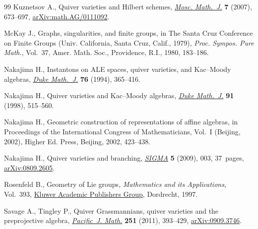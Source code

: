\documentclass[11pt]{article}
\numberwithin{equation}{section}
\numberwithin{equation}{section}
\begin{document}
\begin{thebibliography}{99}
Kuznetsov A., Quiver varieties and {H}ilbert schemes, \href{https://doi.org/10.17323/1609-4514-2007-7-4-673-697}{\textit{Mosc. Math.~J.}}
 \textbf{7} (2007), 673--697, \href{https://arxiv.org/abs/math.AG/0111092}{arXiv:math.AG/0111092}.

McKay J., Graphs, singularities, and finite groups, in The {S}anta {C}ruz
 {C}onference on {F}inite {G}roups ({U}niv. {C}alifornia, {S}anta {C}ruz,
 {C}alif., 1979), \textit{Proc. Sympos. Pure Math.}, Vol.~37, Amer. Math.
 Soc., Providence, R.I., 1980, 183--186.

Nakajima H., Instantons on {ALE} spaces, quiver varieties, and {K}ac--{M}oody
 algebras, \href{https://doi.org/10.1215/S0012-7094-94-07613-8}{\textit{Duke Math.~J.}} \textbf{76} (1994), 365--416.

Nakajima H., Quiver varieties and {K}ac--{M}oody algebras, \href{https://doi.org/10.1215/S0012-7094-98-09120-7}{\textit{Duke
 Math.~J.}} \textbf{91} (1998), 515--560.

Nakajima H., Geometric construction of representations of affine algebras, in
 Proceedings of the {I}nternational {C}ongress of {M}athematicians, {V}ol.~{I}
 ({B}eijing, 2002), Higher Ed. Press, Beijing, 2002, 423--438.

Nakajima H., Quiver varieties and branching, \href{https://doi.org/10.3842/SIGMA.2009.003}{\textit{SIGMA}} \textbf{5} (2009),
 003, 37~pages, \href{https://arxiv.org/abs/0809.2605}{arXiv:0809.2605}.

Rosenfeld B., Geometry of {L}ie groups, \textit{Mathematics and its
 Applications}, Vol.~393, \href{https://doi.org/10.1007/978-1-4757-5325-7}{Kluwer Academic Publishers Group}, Dordrecht, 1997.

Savage A., Tingley P., Quiver {G}rassmannians, quiver varieties and the
 preprojective algebra, \href{https://doi.org/10.2140/pjm.2011.251.393}{\textit{Pacific~J. Math.}} \textbf{251} (2011),
 393--429, \href{https://arxiv.org/abs/0909.3746}{arXiv:0909.3746}.

\end{thebibliography}
\end{document}
